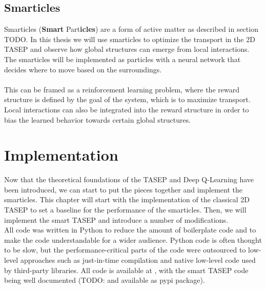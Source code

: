 \section{Smarticles}
\label{sec:smarticles}
Smarticles (\textbf{Smart} Part\textbf{icles}) are a form of active matter as described in section TODO. In this thesis we will use smarticles to optimize the transport in the 2D TASEP and observe how global structures can emerge from local interactions. The smarticles will be implemented as particles with a neural network that decides where to move based on the surroundings. 
\\
\\
This can be framed as a reinforcement learning problem, where the reward structure is defined by the goal of the system, which is to maximize transport. Local interactions can also be integrated into the reward structure in order to bias the learned behavior towards certain global structures.  


\chapter{Implementation}
\label{ch:implementation}
Now that the theoretical foundations of the TASEP and Deep Q-Learning have been introduced, we can start to put the pieces together and implement the smarticles. This chapter will start with the implementation of the classical 2D TASEP to set a baseline for the performance of the smarticles. Then, we will implement the smart TASEP and introduce a number of modifications. 
\\
All code was written in Python to reduce the amount of boilerplate code and to make the code understandable for a wider audience. Python code is often thought to be slow, but the performance-critical parts of the code were outsourced to low-level approaches such as just-in-time compilation and native low-level code used by third-party libraries. 
All code is available at \cite{maertens_smarttasep_github_2023}, with the smart TASEP code being well documented (TODO: and available as pypi package).

